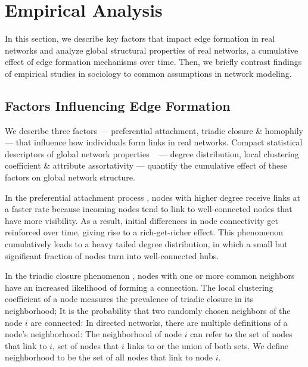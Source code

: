 \section{Empirical Analysis}
\label{sec:Analysis}

In this section, we describe key factors that impact edge formation in
real networks and analyze global structural properties of real networks,
a cumulative effect of edge formation mechanisms over time. Then, we briefly
contrast findings of empirical studies in sociology to common assumptions in
network modeling.

\subsection{Factors Influencing Edge Formation}
\label{subsec:factors}

We describe three factors --- preferential attachment, triadic closure \&
homophily --- that influence how individuals form links in real networks.
Compact statistical descriptors of global network properties
~\cite{newman2010networks} --- degree distribution, local clustering
coefficient \& attribute assortativity --- quantify the cumulative effect of these
factors on global network structure.

In the preferential attachment process \cite{simon1955class,
barabasi1999emergence}, nodes with higher degree receive links at a
faster rate because incoming nodes tend to link to well-connected nodes that
have more visibility. As a result, initial
differences in node connectivity get reinforced over time, giving rise to a
rich-get-richer effect. This phenomenon cumulatively leads to a heavy tailed
degree distribution, in which a small but significant fraction of nodes turn
into well-connected hubs.

In the triadic closure phenomenon \cite{simmel1950sociology, newman2001clustering},
nodes with one or more common neighbors have an increased likelihood of forming a connection.
The local clustering coefficient of a node measures the prevalence of triadic closure in its
neighborhood; It is the probability that two randomly chosen neighbors of the node $i$
are connected: In directed networks, there are multiple definitions of a node's neighborhood:
The neighborhood of node $i$ can refer to the set of
nodes that link to $i$, set of nodes that $i$ links to or the union of both sets.
We define neighborhood to be the set of all nodes that link to
node $i$.

